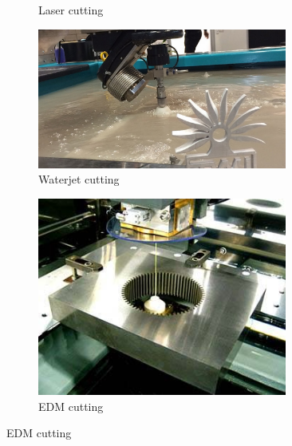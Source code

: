 \begin{figure}[H]
\begin{subfigure}[b]{.24\linewidth}
			\caption{Laser cutting}
		\end{subfigure}\begin{subfigure}[b]{.24\linewidth}
			\includegraphics[width=0.9\textwidth]{imgs/waterjet.jpeg}
			\caption{Waterjet cutting}
		\end{subfigure}\begin{subfigure}[b]{.24\linewidth}
			\includegraphics[width=0.9\textwidth]{imgs/edm.jpeg}
			\caption{EDM cutting}
		\end{subfigure}
	\end{figure}
 
